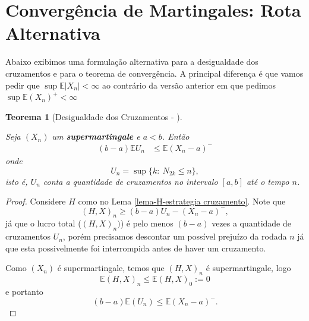 \documentclass[12pt,a4paper,oneside]{book}
\newtheorem{theorem}{Teorema}[section]
\theoremstyle{definition}
\theoremstyle{remark}
\numberwithin{equation}{section}
\newcommand{\E}{\mathbb{E}}
\begin{document}
\newpage
\section{Convergência de Martingales: Rota Alternativa}

Abaixo exibimos uma formulação alternativa para a desigualdade dos cruzamentos e para o teorema de convergência. A principal diferença é que vamos pedir que $\sup \E |X_n|<\infty$ ao contrário da versão anterior em que pedimos $\sup \E (X_n)^+<\infty$

\begin{theorem}[Desigualdade dos Cruzamentos - \cite{williams-martingales}]\label{teo-desicruzamentos-will}

Seja $(X_n)$ um \textbf{supermartingale} e $a<b$. Então
\begin{align*}
(b-a)\E U_n &\leq \E(X_n-a)^-
\end{align*}
onde 
$$U_n = \sup\{k:\ N_{2k}\leq n\}, $$
isto é, $U_n$ conta a quantidade de cruzamentos no intervalo $[a,b]$ até o tempo $n$.
\end{theorem}
\begin{proof}
Considere  $H$ como no Lema \ref{lema-H-estrategia cruzamento}. Note que
$$(H,X)_n \geq (b-a)U_n - (X_n-a)^-, $$
já que o  lucro total ($(H,X)_n)$) é pelo menos $(b-a)$ vezes a quantidade de cruzamentos $U_n$, porém precisamos descontar um possível prejuízo da rodada $n$ já que esta possivelmente foi interrompida antes de haver um cruzamento. 

Como $(X_n)$ é supermartingale, temos que $(H,X)_n$ é supermartingale, logo 
$$\E(H,X)_n \leq \E(H,X)_0 :=0 $$
e portanto
$$(b-a)\E(U_n) \leq \E(X_n-a)^-. $$
\end{proof}
\end{document}
